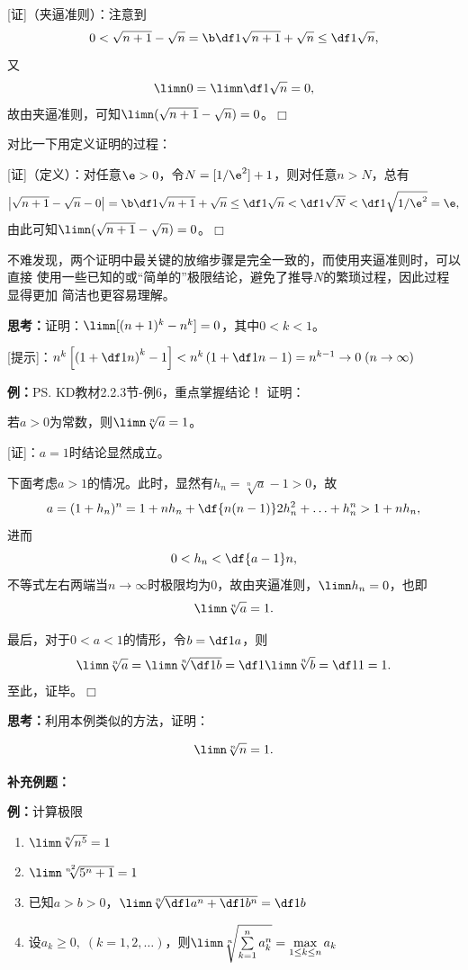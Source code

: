 [证]（夹逼准则）：注意到
$$0<\sqrt{n+1}-\sqrt{n}={\b\df1{\sqrt{n+1}+\sqrt{n}}
\leq\df 1{\sqrt{n}}},$$
又
$$\limn 0=\limn\df 1{\sqrt{n}}=0,$$
故由夹逼准则，可知$\limn (\sqrt{n+1}-\sqrt{n})=0$。\hfill $\Box$

对比一下用定义证明的过程：

[证]（定义）：对任意$\e>0$，令$N=[1/\e^2]+1$，则对任意$n>N$，总有
$$\left|\sqrt{n+1}-\sqrt{n}-0\right|
={\b\df1{\sqrt{n+1}+\sqrt{n}}\leq\df 1{\sqrt{n}}}
<\df 1{\sqrt{N}}<\df 1{\sqrt{1/\e^2}}=\e,$$
由此可知$\limn (\sqrt{n+1}-\sqrt{n})=0$。\hfill $\Box$

不难发现，两个证明中最关键的放缩步骤是完全一致的，而使用夹逼准则时，可以直接
使用一些已知的或“简单的”极限结论，避免了推导$N$的繁琐过程，因此过程显得更加
简洁也更容易理解。

{\bf 思考：}证明：$\limn [(n+1)^k-{n}^k]=0$，其中$0<k<1$。

[提示]：$n^k\left[\left(1+\df1n\right)^k-1\right]
<n^k\left(1+\df1n-1\right)=n^{k-1}\to 0\;(n\to\infty)$

{\bf 例：}\ps{KD教材2.2.3节-例6，重点掌握结论！}
证明：
\begin{thx}
	若$a>0$为常数，则$\limn \sqrt[n]{a}=1$。
\end{thx}
[证]：$a=1$时结论显然成立。

下面考虑$a>1$的情况。此时，显然有$h_n=\sqrt[n]a-1>0$，故
$$a=(1+h_n)^n=1+nh_n+\df{n(n-1)}2h_n^2+\ldots+h_n^n>1+nh_n,$$
进而
$$0<h_n<\df{a-1}n,$$
不等式左右两端当$n\to\infty$时极限均为$0$，故由夹逼准则，$\limn h_n=0$，也即
$$\limn\sqrt[n]a=1.$$

最后，对于$0<a<1$的情形，令$b=\df1a$，则
$$\limn\sqrt[n]a=\limn\sqrt[n]{\df1b}
=\df1{\limn\sqrt[n]b}=\df11=1.$$
至此，证毕。\hfill$\Box$

{\bf 思考：}利用本例类似的方法，证明：
\begin{thx}
	$$\limn\sqrt[n]n=1.$$
\end{thx}

{\bf 补充例题：}

{\bf 例：}计算极限
\begin{enumerate}[(1)]
  \setlength{\itemindent}{1cm}
  \item $\limn\sqrt[n]{n^5}=1$
  \item $\limn\sqrt[n^2]{5^n+1}=1$
  \item 已知$a>b>0$，$\limn\sqrt[n]{\df1{a^n}+\df1{b^n}}=\df1b$
  \item 设$a_k\geq0,\;(k=1,2,\ldots)$，则$\limn\sqrt[n]
  {\sum\limits_{k=1}^na_k^n}=\max\limits_{1\leq k\leq n}a_k$
\end{enumerate}

